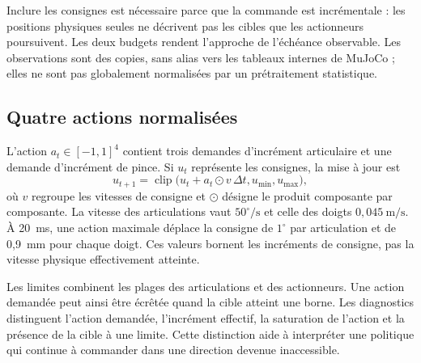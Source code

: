 \documentclass[conference,a4paper]{IEEEtran}
\begin{document}
Inclure les consignes est nécessaire parce que la commande est incrémentale : les positions physiques seules ne décrivent pas les cibles que les actionneurs poursuivent. Les deux budgets rendent l'approche de l'échéance observable. Les observations sont des copies, sans alias vers les tableaux internes de MuJoCo ; elles ne sont pas globalement normalisées par un prétraitement statistique.

\subsection{Quatre actions normalisées}
L'action $a_t\in[-1,1]^4$ contient trois demandes d'incrément articulaire et une demande d'incrément de pince. Si $u_t$ représente les consignes, la mise à jour est
\begin{equation}
u_{t+1}=\operatorname{clip}\bigl(u_t+a_t\odot v\,\Delta t,
u_{\min},u_{\max}\bigr),
\end{equation}
où $v$ regroupe les vitesses de consigne et $\odot$ désigne le produit composante par composante. La vitesse des articulations vaut $50^\circ/\mathrm{s}$ et celle des doigts $0{,}045~\mathrm{m/s}$. À 20~ms, une action maximale déplace la consigne de $1^\circ$ par articulation et de 0,9~mm pour chaque doigt. Ces valeurs bornent les incréments de consigne, pas la vitesse physique effectivement atteinte.

Les limites combinent les plages des articulations et des actionneurs. Une action demandée peut ainsi être écrêtée quand la cible atteint une borne. Les diagnostics distinguent l'action demandée, l'incrément effectif, la saturation de l'action et la présence de la cible à une limite. Cette distinction aide à interpréter une politique qui continue à commander dans une direction devenue inaccessible.
\end{document}
